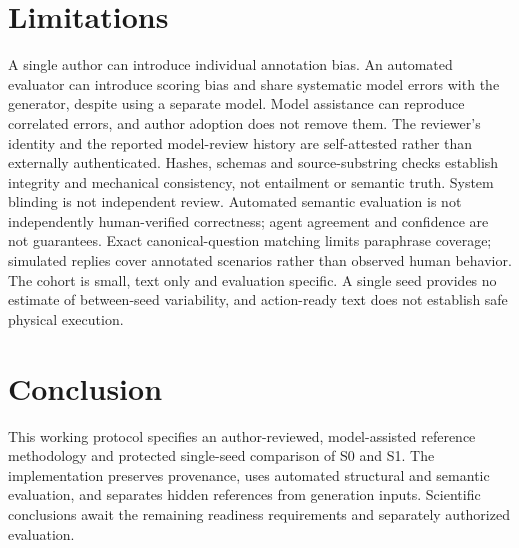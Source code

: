 \documentclass[10pt,conference]{IEEEtran}
\begin{document}
\section{Limitations}
A single author can introduce individual annotation bias. An automated evaluator can introduce scoring bias and share systematic model errors with the generator, despite using a separate model. Model assistance can reproduce correlated errors, and author adoption does not remove them. The reviewer's identity and the reported model-review history are self-attested rather than externally authenticated. Hashes, schemas and source-substring checks establish integrity and mechanical consistency, not entailment or semantic truth. System blinding is not independent review. Automated semantic evaluation is not independently human-verified correctness; agent agreement and confidence are not guarantees. Exact canonical-question matching limits paraphrase coverage; simulated replies cover annotated scenarios rather than observed human behavior. The cohort is small, text only and evaluation specific. A single seed provides no estimate of between-seed variability, and action-ready text does not establish safe physical execution.

\section{Conclusion}
This working protocol specifies an author-reviewed, model-assisted reference methodology and protected single-seed comparison of S0 and S1. The implementation preserves provenance, uses automated structural and semantic evaluation, and separates hidden references from generation inputs. Scientific conclusions await the remaining readiness requirements and separately authorized evaluation.
\end{document}

